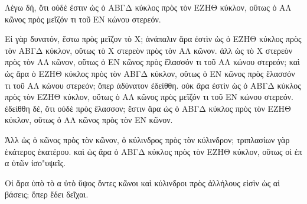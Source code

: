 \begin{Parallel}{}{}
{{\greekfont Λέγω δή, ὅτι οὐδέ ἐστιν ὡς ὁ ΑΒΓΔ κύκλος πρὸς τὸν
ΕΖΗΘ κύκλον, οὕτως ὁ ΑΛ κῶνος πρὸς μεῖζόν τι τοῦ ΕΝ
κώνου στερεόν.}

{\greekfont Εἰ γὰρ δυνατόν, ἕστω πρὸς μεῖζον τὸ Χ; ἀνάπαλιν ἄρα ἐστὶν ὡς ὁ ΕΖΗΘ κύκλος πρὸς τὸν ΑΒΓΔ κύκλον,  οὕτως τὸ Χ στερεὸν πρὸς τὸν
ΑΛ κῶνον. ἀλλ ὡς τὸ Χ στερεὸν πρὸς τὸν ΑΛ κῶνον, οὕτως ὁ ΕΝ
κῶνος πρὸς ἔλασσόν τι τοῦ ΑΛ κώνου στερεόν; καὶ ὡς ἄρα ὁ ΕΖΗΘ
κύκλος πρὸς τὸν ΑΒΓΔ κύκλον, οὕτως ὁ ΕΝ κῶνος πρὸς ἔλασσόν τι τοῦ ΑΛ κώνου
στερεόν; ὅπερ ἀδύνατον ἐδείθθη. οὐκ ἄρα ἐστὶν ὡς ὁ ΑΒΓΔ κύκλος πρὸς τὸν ΕΖΗΘ κύκλον, οὕτως ὁ ΑΛ κῶνος πρὸς μεῖζόν
τι τοῦ ΕΝ κώνου στερεόν. ἐδείθθη δέ, ὅτι οὐδὲ πρὸς ἔλασσον;
ἔστιν ἄρα ὡς ὁ ΑΒΓΔ κύκλος πρὸς τὸν ΕΖΗΘ κύκλον, οὕτως
ὁ ΑΛ κῶνος πρὸς τὸν ΕΝ κῶνον.}

{\greekfont Ἀλλ ὡς ὁ κῶνος πρὸς τὸν κῶνον, ὁ κύλινδρος πρὸς τὸν
κύλινδρον; τριπλασίων γὰρ ἑκάτερος ἑκατέρου. καὶ ὡς ἄρα
ὁ ΑΒΓΔ κύκλος πρὸς τὸν ΕΖΗΘ κύκλον, οὕτως οἱ ἐπ
α ὐτῶν ἰσο"υψεῖς.}

{\greekfont Οἱ ἄρα ὑπὸ τὸ α ὐτὸ ὕψος ὄντες κῶνοι καὶ κύλινδροι πρὸς
ἀλλήλους εἰσὶν ὡς αἱ βάσεις; ὅπερ ἔδει δεῖχαι.}}

\end{Parallel}
